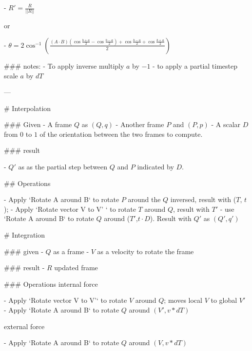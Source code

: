 - $  R' = \frac R {||R||} $  

or

- $\theta = 2 \cos^{-1} ( \frac { (A \cdot B) ( \cos \frac {b + a} 2  - \cos \frac {b - a} 2 ) +  \cos \frac {b - a} 2  +  \cos \frac {b + a} 2 } 2 ) $



### notes:
 - To apply inverse multiply $a$ by $-1$ 
 - to apply a partial timestep scale $a$ by $dT$





---

# Interpolation

### Given
- A frame $Q$ as $(Q,q)$
- Another frame $P$ and $(P,p)$
- A scalar $D$ from $0$ to $1$ of the orientation between the two frames to compute.

### result

- $Q'$ as as the partial step between $Q$ and $P$ indicated by $D$.

## Operations

- Apply `Rotate A around B` to rotate $P$ around the $Q$ inversed, result with ($T$, $t$);
- Apply `Rotate vector V to V' ` to rotate $T$ around $Q$, result with $T'$
- use `Rotate A around B` to rotate $Q$ around ($T'$,$t \cdot D$).  Result with $Q'$  as $(Q',q')$


# Integration

### given
- $Q$ as a frame 
- $V$ as a velocity to rotate the frame

### result
- $R$ updated frame

### Operations
internal force

- Apply `Rotate vector V to V'` to rotate $V$ around ${Q}$; moves local $V$ to global $V'$
- Apply `Rotate A around B` to rotate ${Q}$ around $(V',v * dT)$

external force
  
- Apply `Rotate A around B` to rotate ${Q}$ around $(V,v * dT)$

